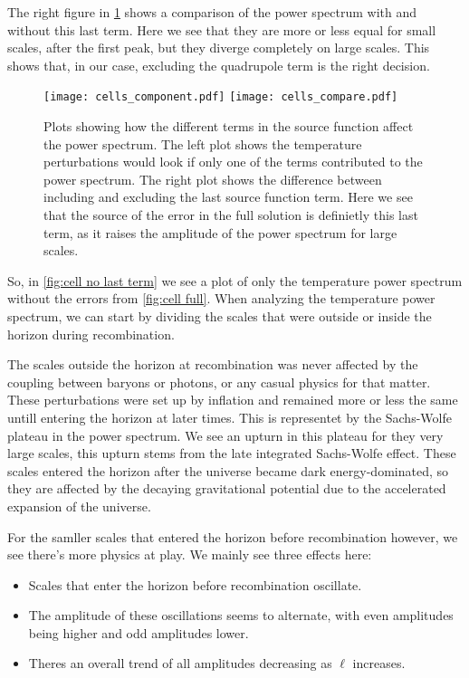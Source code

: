 \documentclass[12pt]{article}
\begin{document}
The right figure in \cref{fig:cell debugging} shows a comparison of the power spectrum with and without this last term. Here we see that they are more or less equal for small scales, after the first peak, but they diverge completely on large scales. This shows that, in our case, excluding the quadrupole term is the right decision. 



\begin{figure}[h]
    \centering
    \texttt{[image: cells\_component.pdf]}
    \texttt{[image: cells\_compare.pdf]}  
    \caption{Plots showing how the different terms in the source function affect the power spectrum. The left plot shows the temperature perturbations would look if only one of the terms contributed to the power spectrum. The right plot shows the difference between including and excluding the last source function term. Here we see that the source of the error in the full solution is definietly this last term, as it raises the amplitude of the power spectrum for large scales.}
    \label{fig:cell debugging}
\end{figure}

So, in \cref{fig:cell no last term} we see a plot of only the temperature power spectrum without the errors from \cref{fig:cell full}. When analyzing the temperature power spectrum, we can start by dividing the scales that were outside or inside the horizon during recombination. 

The scales outside the horizon at recombination was never affected by the coupling between baryons or photons, or any casual physics for that matter. These perturbations were set up by inflation and remained more or less the same untill entering the horizon at later times. This is representet by the Sachs-Wolfe plateau in the power spectrum. We see an upturn in this plateau for they very large scales, this upturn stems from the late integrated Sachs-Wolfe effect. These scales entered the horizon after the universe became dark energy-dominated, so they are affected by the decaying gravitational potential due to the accelerated expansion of the universe.

For the samller scales that entered the horizon before recombination however, we see there's more physics at play. We mainly see three effects here: 
\begin{itemize}
\item Scales that enter the horizon before recombination oscillate.
\item The amplitude of these oscillations seems to alternate, with even amplitudes being higher and odd amplitudes lower.
\item Theres an overall trend of all amplitudes decreasing as $\ell$ increases.
\end{itemize}
\end{document}
